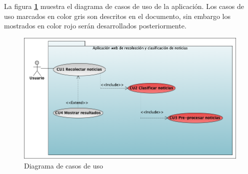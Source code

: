 


La figura \textbf{\ref{fig:DCU}} muestra el diagrama de casos de uso de la aplicación. Los casos de uso marcados en color gris son descritos en el documento, sin embargo los mostrados en color rojo serán desarrollados posteriormente.

\begin{figure}[h]
  \centering
  \includegraphics[scale=.4]{imagenes/Diagramas/CasosDeuso/CasosDeuso}
  \caption{Diagrama de casos de uso}
  \label{fig:DCU}
\end{figure}
